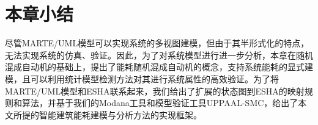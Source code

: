 	
	
\section{本章小结}
	尽管MARTE/UML模型可以实现系统的多视图建模，但由于其半形式化的特点，无法实现系统的仿真、验证。因此，为了对系统模型进行进一步分析，本章在随机混成自动机的基础上，提出了能耗随机混成自动机的概念，支持系统能耗的显式建模，且可以利用统计模型检测方法对其进行系统属性的高效验证。为了将MARTE/UML模型和ESHA联系起来，我们给出了扩展的状态图到ESHA的映射规则和算法，并基于我们的Modana工具和模型验证工具UPPAAL-SMC，给出了本文所提的智能建筑能耗建模与分析方法的实现框架。


